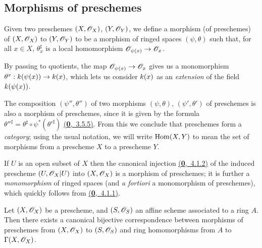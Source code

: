 \subsection{Morphisms of preschemes}
\label{subsection-prescheme-morphisms}

\begin{defn}[2.2.1]
\label{defn-1.2.2.1}
Given two preschemes $(X,\mathscr{O}_X)$, $(Y,\mathscr{O}_Y)$, we
define a morphism (of preschemes) of $(X,\mathscr{O}_X)$ to $(Y,\mathscr{O}_Y)$ to be a morphism
of ringed spaces $(\psi,\theta)$ such that, for all $x\in X$, $\theta_x^\sharp$ is a
local homomorphism $\mathscr{O}_{\psi(x)}\to\mathscr{O}_x$.
\end{defn}

By passing to quotients, the map $\mathscr{O}_{\psi(x)}\to\mathscr{O}_x$ gives us a monomorphism
$\theta^x:k(\psi(x))\to k(x)$, which lets us consider $k(x)$ as an
{\it extension} of the field $k(\psi(x))$.

\begin{env}[2.2.2]
\label{env-1.2.2.2}
The composition $(\psi'',\theta'')$ of two morphisms
$(\psi,\theta)$, $(\psi',\theta')$ of preschemes is also a morphism of
preschemes, since it is given by the formula
${\theta''}^\sharp=\theta^\sharp\circ\psi^*({\theta'}^\sharp)$ \hyperref[env-0.3.5.5]{(\textbf{0},~3.5.5)}. From this
we conclude that preschemes form a {\it category}; using the usual notation, we
will write ${\mathop{\mathrm{Hom}}\nolimits}(X,Y)$ to mean the set of morphisms from a prescheme $X$ to a
prescheme $Y$.
\end{env}

\begin{exm}[2.2.3]
\label{exm-1.2.2.3}
If $U$ is an open subset of $X$ then the canonical
injection \hyperref[env-0.4.1.2]{(\textbf{0},~4.1.2)} of the induced prescheme $(U,\mathscr{O}_X|U)$ into
$(X,\mathscr{O}_X)$ is a morphism of preschemes; it is further a {\it monomorphism} of
ringed spaces (and {\it a fortiori} a monomorphism of preschemes), which
quickly follows from \hyperref[env-0.4.1.1]{(\textbf{0},~4.1.1)}.
\end{exm}

\begin{prop}[2.2.4]
\label{prop-1.2.2.4}
Let $(X,\mathscr{O}_X)$ be a prescheme, and $(S,\mathscr{O}_S)$ an
affine scheme associated to a ring $A$. Then there exists a canonical bijective
correspondence between morphisms of preschemes from $(X,\mathscr{O}_X)$ to $(S,\mathscr{O}_S)$ and
ring homomorphisms from $A$ to $\Gamma(X,\mathscr{O}_X)$.
\end{prop}

